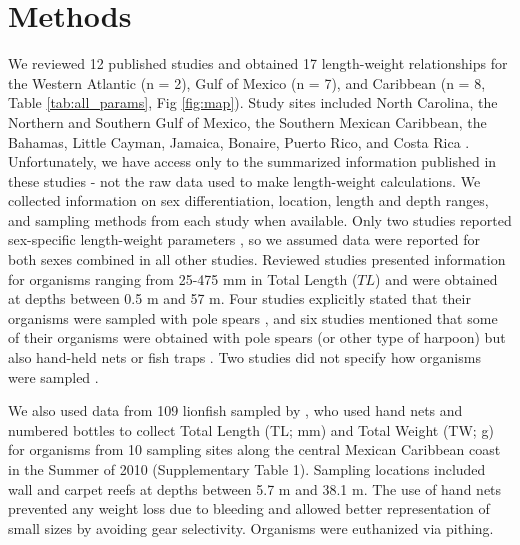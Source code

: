 \documentclass[fleqn,10pt,lineno]{wlpeerj} %
\begin{document}
\section*{Methods}

We reviewed 12 published studies and obtained 17 length-weight
relationships for the Western Atlantic (n = 2), Gulf of Mexico (n = 7),
and Caribbean (n = 8, Table \ref{tab:all_params}, Fig \ref{fig:map}).
Study sites included North Carolina, the Northern and Southern Gulf of
Mexico, the Southern Mexican Caribbean, the Bahamas, Little Cayman,
Jamaica, Bonaire, Puerto Rico, and Costa Rica
\citep{barbour_2011,darling_2011,deleon_2013,fogg_2013,dahl_2014,edwards_2014,toledohernndez_2014,sandel_2015,aguilarperera_2016,sabidoitza_2016,sabidoitz_2016,chin_2016}.
Unfortunately, we have access only to the summarized information
published in these studies - not the raw data used to make length-weight
calculations. We collected information on sex differentiation, location,
length and depth ranges, and sampling methods from each study when
available. Only two studies reported sex-specific length-weight
parameters \citep{aguilarperera_2016,fogg_2013}, so we assumed data were
reported for both sexes combined in all other studies. Reviewed studies
presented information for organisms ranging from 25-475 mm in Total
Length (\(TL\)) and were obtained at depths between 0.5 m and 57 m. Four
studies explicitly stated that their organisms were sampled with pole
spears \citep{dahl_2014,aguilarperera_2016,chin_2016,sabidoitz_2016},
and six studies mentioned that some of their organisms were obtained
with pole spears (or other type of harpoon) but also hand-held nets or
fish traps
\citep{barbour_2011,fogg_2013,edwards_2014,toledohernndez_2014,sandel_2015,sabidoitza_2016}.
Two studies did not specify how organisms were sampled
\citep{darling_2011,deleon_2013}.

We also used data from 109 lionfish sampled by
\citet{villaseorderbez_2014}, who used hand nets and numbered bottles to
collect Total Length (TL; mm) and Total Weight (TW; g) for organisms
from 10 sampling sites along the central Mexican Caribbean coast in the
Summer of 2010 (Supplementary Table 1). Sampling locations included wall
and carpet reefs at depths between 5.7 m and 38.1 m. The use of hand
nets prevented any weight loss due to bleeding and allowed better
representation of small sizes by avoiding gear selectivity. Organisms
were euthanized via pithing.

\clearpage
\end{document}
